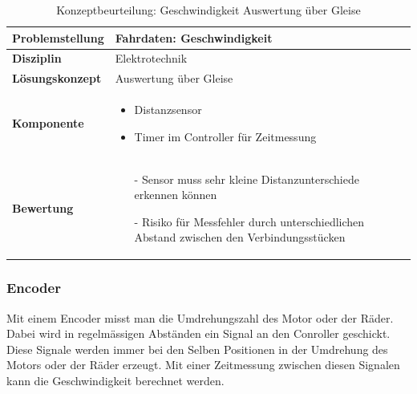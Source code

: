 \documentclass[../../main.tex]{subfiles}
\begin{document}
    \begin{flushleft}
        \begin{table}[H]
        \begin{tabular}{ | l | p{11cm} |}
        \hline
        \textbf{Problemstellung} & Fahrdaten: Geschwindigkeit \\ \hline
        \textbf{Disziplin} & Elektrotechnik \\ \hline
        \textbf{Lösungskonzept} & Auswertung über Gleise\\ \hline
        \textbf{Komponente} & \begin{itemize}
            \item Distanzsensor
            \item Timer im Controller für Zeitmessung
            \end{itemize}\\ \hline
        \textbf{Bewertung} &  \begin{itemize}
                                \item[-] Sensor muss sehr kleine Distanzunterschiede erkennen können
                                \item[-] Risiko für Messfehler durch unterschiedlichen Abstand zwischen den Verbindungsstücken
                              \end{itemize} \\ \hline
        \end{tabular}
        \caption{Konzeptbeurteilung: Geschwindigkeit Auswertung über Gleise}
        \label{tab:fahr_Auswertung_Gleise}
    \end{table}
    \end{flushleft}

    \subsubsection{Encoder}
    Mit einem Encoder misst man die Umdrehungszahl des Motor oder der Räder. Dabei wird in regelmässigen Abständen ein Signal an den Conroller geschickt. Diese Signale werden immer bei den Selben Positionen in der Umdrehung des Motors oder der Räder erzeugt. Mit einer Zeitmessung zwischen diesen Signalen kann die Geschwindigkeit berechnet werden.
\end{document}
